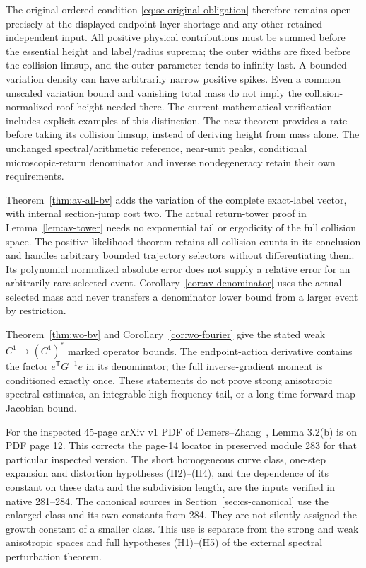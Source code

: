 The original ordered condition \eqref{eq:sc-original-obligation}
therefore remains open precisely at the displayed endpoint-layer
shortage and any other retained independent input. All positive
physical contributions must be summed
before the essential height and label/radius suprema; the outer
widths are fixed before the collision limsup, and the outer
parameter tends to infinity last. A bounded-variation density can
have arbitrarily narrow positive spikes. Even a common unscaled
variation bound and vanishing total mass do not imply the
collision-normalized roof height needed there. The current
mathematical verification includes explicit examples of this
distinction. The new theorem provides a rate before taking its
collision limsup, instead of deriving height from mass alone.
The unchanged spectral/arithmetic reference, near-unit
peaks, conditional microscopic-return denominator and inverse
nondegeneracy retain their own requirements.

Theorem~\ref{thm:av-all-bv} adds the variation of the complete
exact-label vector, with internal section-jump cost two. The
actual return-tower proof in Lemma~\ref{lem:av-tower} needs no
exponential tail or ergodicity of the full collision space.
The positive likelihood theorem retains all collision counts in
its conclusion and handles arbitrary bounded trajectory selectors
without differentiating them. Its polynomial normalized absolute
error does not supply a relative error for an arbitrarily rare
selected event. Corollary~\ref{cor:av-denominator} uses the
actual selected mass and never transfers a denominator lower
bound from a larger event by restriction.

Theorem~\ref{thm:wo-bv} and Corollary~\ref{cor:wo-fourier} give
the stated weak $C^1\to(C^1)^*$ marked operator bounds. The
endpoint-action derivative contains the factor
$e^{\mathsf T}G^{-1}e$ in its denominator; the full inverse-gradient
moment is conditioned exactly once. These statements do not
prove strong anisotropic spectral estimates, an integrable
high-frequency tail, or a long-time forward-map Jacobian bound.

For the inspected 45-page arXiv v1 PDF of
Demers--Zhang~\cite{DZUniform}, Lemma 3.2(b) is on PDF page 12.
This corrects the page-14 locator in preserved module 283 for that
particular inspected version. The short homogeneous curve class,
one-step expansion and distortion hypotheses (H2)--(H4), and the
dependence of its constant on these data and the subdivision
length, are the inputs verified in native 281--284. The canonical
sources in Section~\ref{sec:cs-canonical} use the enlarged class
and its own constants from 284. They are not silently assigned the
growth constant of a smaller class. This use is separate from the
strong and weak anisotropic spaces and full hypotheses (H1)--(H5)
of the external spectral perturbation theorem.

